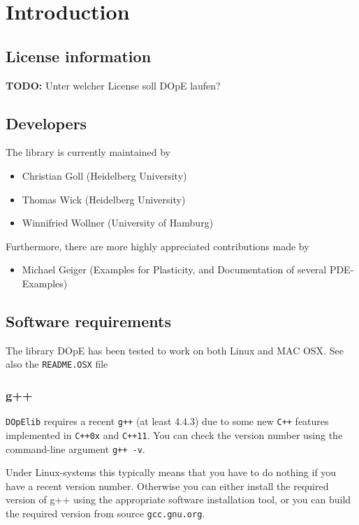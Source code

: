 \chapter{Introduction}\label{chap:intro}
\section{License information}
{\bf TODO:} Unter welcher License soll DOpE laufen?

\section{Developers}
The library is currently maintained by 
\begin{itemize}
  \item Christian Goll (Heidelberg University)
  \item Thomas Wick (Heidelberg University)
  \item Winnifried Wollner (University of Hamburg)
\end{itemize}

Furthermore, there are more highly appreciated contributions
made by %
\begin{itemize}
  \item Michael Geiger (Examples for Plasticity, and Documentation of several PDE-Examples)
\end{itemize}

\section{Software requirements}
The library DOpE has been tested to work on both Linux and 
MAC OSX. See also the \texttt{README.OSX} file 

\subsection{g++}
\texttt{DOpElib} requires a recent \texttt{g++} (at least 4.4.3) due to 
some new \texttt{C++} features implemented in \texttt{C++0x} and \texttt{C++11}. 
You can check the version number using the command-line argument \texttt{g++ -v}.

Under Linux-systems this typically means that you have to do nothing if you have a recent 
version number. Otherwise you can either install the required version of g++ using the 
appropriate software installation tool, or you can build the required version from 
source \texttt{gcc.gnu.org}.

